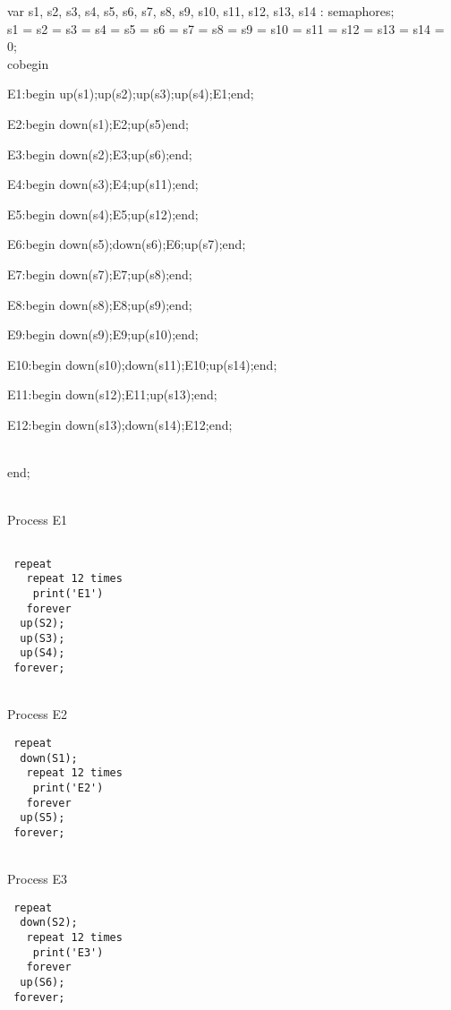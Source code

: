 \documentclass{article}
\begin{document}
\begin{itemize}
\begin{otherlanguage}{english}
        var s1, s2, s3, s4, s5, s6, s7, s8, s9, s10, s11, s12, s13, s14 : semaphores;
        \\
        
        s1 = s2 = s3 = s4 = s5 = s6 = s7 = s8 = s9 = s10 = s11 = s12 = s13 = s14 = 0;
        \\          
        
       cobegin
       \begin{sem}
        \item[] E1:begin up(s1);up(s2);up(s3);up(s4);E1;end;
        \item[] E2:begin down(s1);E2;up(s5)end;
        \item[] E3:begin down(s2);E3;up(s6);end;
        \item[] E4:begin down(s3);E4;up(s11);end;
        \item[] E5:begin down(s4);E5;up(s12);end;
        \item[] E6:begin down(s5);down(s6);E6;up(s7);end;
        \item[] E7:begin down(s7);E7;up(s8);end;
        \item[] E8:begin down(s8);E8;up(s9);end;
        \item[] E9:begin down(s9);E9;up(s10);end;
        \item[] E10:begin down(s10);down(s11);E10;up(s14);end;
        \item[] E11:begin down(s12);E11;up(s13);end;
        \item[] E12:begin down(s13);down(s14);E12;end;
      \end{sem}
      \\end;
      \\\begin{multicols}{2}
\\Process E1
\begin{lstlisting}

 repeat
   repeat 12 times
    print('E1')
   forever
  up(S2);
  up(S3);
  up(S4);
 forever;
\end{lstlisting}

\\Process E2
\begin{lstlisting}
 repeat
  down(S1);
   repeat 12 times
    print('E2')
   forever
  up(S5);
 forever;
\end{lstlisting}


\\Process E3
\begin{lstlisting}
 repeat
  down(S2);
   repeat 12 times
    print('E3')
   forever
  up(S6);
 forever;
\end{lstlisting}


\end{multicols}
\end{otherlanguage}
\end{itemize}
\end{document}
